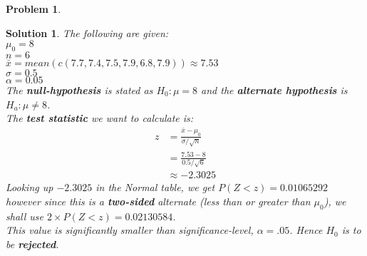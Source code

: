 \documentclass{article}
\newtheorem{problem}{Problem}
\newtheorem*{solution*}{Solution}
\begin{document}
\begin{problem}
\end{problem}
\begin{solution*}The following are given:\\
    $\mu_0=8$\\
    $n=6$\\
    $\bar{x} = mean(c(7.7, 7.4, 7.5, 7.9, 6.8, 7.9)) \approx 7.53$\\
    $\sigma=0.5$\\
    $\alpha=0.05$\\

    The \textbf{null-hypothesis} is stated as $H_0:\mu=8$ and the \textbf{alternate hypothesis} is
    $H_a:\mu\ne{8}$.\\

    The \textbf{test statistic} we want to calculate is:
    \begin{align*}
        z&=\frac{\bar{x}-\mu_0}{\sigma/\sqrt{n}}\\
        &=\frac{7.53-8}{0.5/\sqrt{6}}\\
        &\approx -2.3025
    \end{align*}
    Looking up $-2.3025$ in the Normal table, we get $P(Z<z)=0.01065292$
    however since this is a \textbf{two-sided} alternate (less than or greater than $\mu_0$),
    we shall use $2\times P(Z<z)=0.02130584$.\\

    This value is significantly smaller than significance-level, $\alpha=.05$.
    Hence $H_0$ is to be \textbf{rejected}.
\end{solution*}
\end{document}
